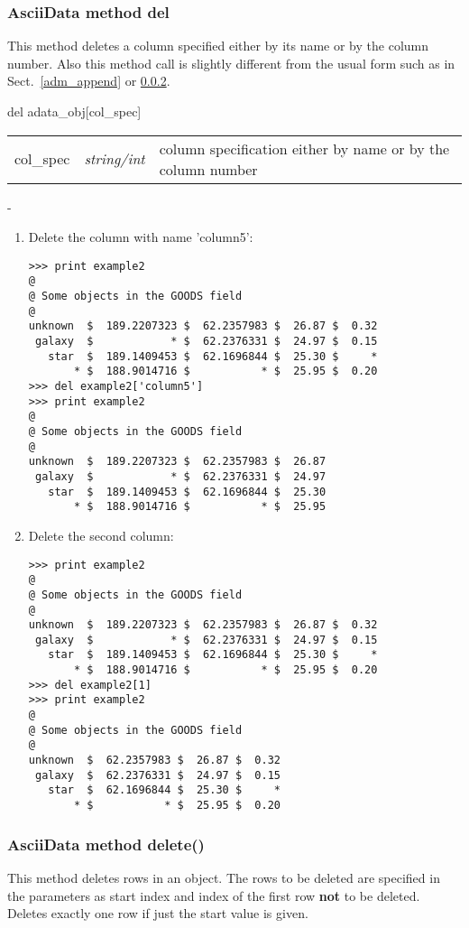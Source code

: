 \subsubsection{AsciiData method del}
\label{adm_del}
This method deletes a column specified either by its name or
by the column number. Also this method call is slightly
different from the usual form such as in Sect.\ \ref{adm_append}
or \ref{adm_delete}.

del adata\_obj[col\_spec]

\begin{tabular}{lcl}
col\_spec &{\it string/int}& column specification either by name or by
the column number\\
\end{tabular}

-

\begin{enumerate}
\item Delete the column with name 'column5':
\begin{verbatim}
>>> print example2
@
@ Some objects in the GOODS field
@
unknown  $  189.2207323 $  62.2357983 $  26.87 $  0.32
 galaxy  $            * $  62.2376331 $  24.97 $  0.15
   star  $  189.1409453 $  62.1696844 $  25.30 $     *
       * $  188.9014716 $           * $  25.95 $  0.20
>>> del example2['column5']
>>> print example2
@
@ Some objects in the GOODS field
@
unknown  $  189.2207323 $  62.2357983 $  26.87
 galaxy  $            * $  62.2376331 $  24.97
   star  $  189.1409453 $  62.1696844 $  25.30
       * $  188.9014716 $           * $  25.95
\end{verbatim}
\item Delete the second column:
\begin{verbatim}
>>> print example2
@
@ Some objects in the GOODS field
@
unknown  $  189.2207323 $  62.2357983 $  26.87 $  0.32
 galaxy  $            * $  62.2376331 $  24.97 $  0.15
   star  $  189.1409453 $  62.1696844 $  25.30 $     *
       * $  188.9014716 $           * $  25.95 $  0.20
>>> del example2[1]
>>> print example2
@
@ Some objects in the GOODS field
@
unknown  $  62.2357983 $  26.87 $  0.32
 galaxy  $  62.2376331 $  24.97 $  0.15
   star  $  62.1696844 $  25.30 $     *
       * $           * $  25.95 $  0.20
\end{verbatim}
\end{enumerate}

\subsubsection{AsciiData method delete()}
\label{adm_delete}
This method deletes rows in an \ad object. The rows to be deleted
are specified in the parameters as start index and index of the
first row {\bf not} to be deleted. Deletes exactly one row if just
the start value is given.


